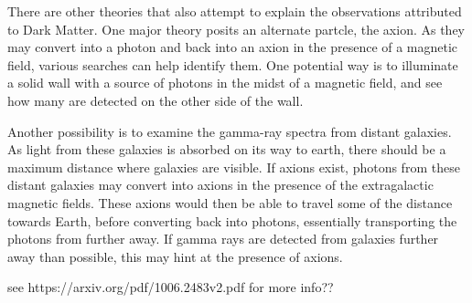 There are other theories that also attempt to explain the observations attributed to Dark Matter.
One major theory posits an alternate partcle, the axion.
As they may convert into a photon and back into an axion in the presence of a magnetic field, various searches can help identify them.
One potential way is to illuminate a solid wall with a source of photons in the midst of a magnetic field, and see how many are detected on the other side of the wall.

Another possibility is to examine the gamma-ray spectra from distant galaxies.
As light from these galaxies is absorbed on its way to earth, there should be a maximum distance where galaxies are visible.
If axions exist, photons from these distant galaxies may convert into axions in the presence of the extragalactic magnetic fields.
These axions would then be able to travel some of the distance towards Earth, before converting back into photons, essentially transporting the photons from further away.
If gamma rays are detected from galaxies further away than possible, this may hint at the presence of axions.

see https://arxiv.org/pdf/1006.2483v2.pdf for more info??




%
%







